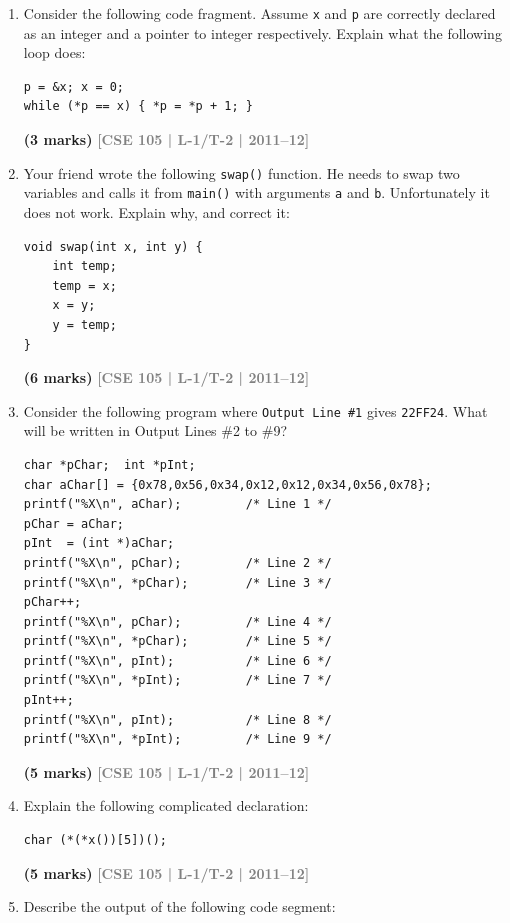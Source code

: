 \documentclass[12pt,a3paper]{article}
\newcommand{\yr}[1]{\hfill\textcolor{gray}{\small\textbf{[#1]}}}
\newcommand{\mk}[1]{\textcolor{orange!70!black}{\small\textbf{(#1 marks)}}}
\begin{document}
\begin{enumerate}
\mk{10} \yr{CSE 105 | L-1/T-2 | 2012--13}

\item Consider the following code fragment. Assume \texttt{x} and \texttt{p} are correctly declared as an integer and a pointer to integer respectively. Explain what the following loop does:
 
\begin{lstlisting}
p = &x; x = 0;
while (*p == x) { *p = *p + 1; }
\end{lstlisting}
\mk{3} \yr{CSE 105 | L-1/T-2 | 2011--12}

\item Your friend wrote the following \texttt{swap()} function. He needs to swap two variables and calls it from \texttt{main()} with arguments \texttt{a} and \texttt{b}. Unfortunately it does not work. Explain why, and correct it:
 
\begin{lstlisting}
void swap(int x, int y) {
    int temp;
    temp = x;
    x = y;
    y = temp;
}
\end{lstlisting}
\mk{6} \yr{CSE 105 | L-1/T-2 | 2011--12}

\item Consider the following program where \texttt{Output Line \#1} gives \texttt{22FF24}. What will be written in Output Lines \#2 to \#9?
 
\begin{lstlisting}
char *pChar;  int *pInt;
char aChar[] = {0x78,0x56,0x34,0x12,0x12,0x34,0x56,0x78};
printf("%X\n", aChar);         /* Line 1 */
pChar = aChar;
pInt  = (int *)aChar;
printf("%X\n", pChar);         /* Line 2 */
printf("%X\n", *pChar);        /* Line 3 */
pChar++;
printf("%X\n", pChar);         /* Line 4 */
printf("%X\n", *pChar);        /* Line 5 */
printf("%X\n", pInt);          /* Line 6 */
printf("%X\n", *pInt);         /* Line 7 */
pInt++;
printf("%X\n", pInt);          /* Line 8 */
printf("%X\n", *pInt);         /* Line 9 */
\end{lstlisting}
\mk{5} \yr{CSE 105 | L-1/T-2 | 2011--12}

\item Explain the following complicated declaration:
\begin{lstlisting}
char (*(*x())[5])();
\end{lstlisting}
\mk{5} \yr{CSE 105 | L-1/T-2 | 2011--12}

\item Describe the output of the following code segment:
 

\end{enumerate}
\end{document}
